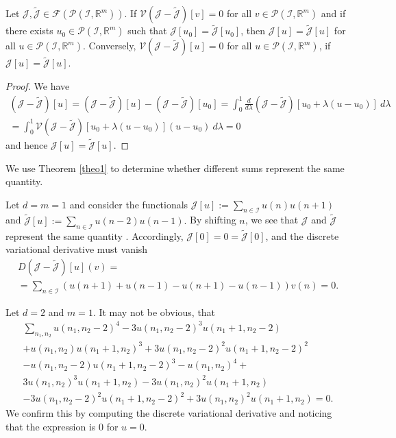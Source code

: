 \documentclass[runningheads]{llncs}
\newcommand{\Rr}{\mathbb{R}}
\newcommand{\1}{\chi}
\newcommand{\Ii}{\mathcal{I}}
\begin{document}
\begin{theorem}\label{theo1}
	Let $\mathcal{J},\tilde{\mathcal{J}}\in \mathcal{F}(\mathcal{P}(\Ii,\Rr^m))$. If $\mathcal{V}(\mathcal{J}-\tilde{\mathcal{J}})[v]=0$ for all $v\in\mathcal{P}(\Ii,\Rr^m)$ and if there exists $u_0\in\mathcal{P}(\Ii,\Rr^m)$ such that $\mathcal{J}[u_0]=\tilde{\mathcal{J}}[u_0]$, then
	$\mathcal{J}[u]=\tilde{\mathcal{J}}[u]$
	for all $u\in\mathcal{P}(\Ii,\Rr^m)$.
	Conversely,
	$\mathcal{V}(\mathcal{J}-\tilde{\mathcal{J}})[u]=0$
	for all $u\in\mathcal{P}(\Ii,\Rr^m)$, if $\mathcal{J}[u]=\tilde{\mathcal{J}}[u]$.
\end{theorem}
\begin{proof}
	We have
	\begin{gather*}
		(\mathcal{J}-\tilde{\mathcal{J}})[u]=(\mathcal{J}-\tilde{\mathcal{J}})[u]-(\mathcal{J}-\tilde{\mathcal{J}})[u_0]=
		\int_{0}^{1}\frac{d}{d\lambda}(\mathcal{J}-\tilde{\mathcal{J}})[u_0+\lambda(u-u_0)]\ d\lambda\\
		=\int_{0}^{1}\mathcal{V}(\mathcal{J}-\tilde{\mathcal{J}})[u_0+\lambda(u-u_0)](u-u_0)\ d\lambda=0
	\end{gather*}
	and hence $\mathcal{J}[u]=\tilde{\mathcal{J}}[u]$.
\end{proof}
We use Theorem \ref{theo1} to determine whether different sums represent the same quantity.
\begin{example}
	Let $d=m=1$ and consider the functionals
$
		\mathcal{J}[u]:=\sum_{n\in\Ii}u(n)u(n+1)$ and $
		\tilde{\mathcal{J}}[u]:=\sum_{n\in\Ii}u(n-2)u(n-1).
$
By shifting $n$, we see that	$\mathcal{J}$ and $\tilde{\mathcal{J}}$ represent the same quantity . Accordingly, $\mathcal{J}[0]=0=\tilde{\mathcal{J}}[0]$, and the discrete variational derivative must vanish
	\begin{gather*}
		D(\mathcal{J}-\tilde{\mathcal{J}})[u](v)=\\
		=\sum_{n\in\Ii}(u(n+1)+u(n-1)-u(n+1)-u(n-1))v(n)=0.
	\end{gather*}
\end{example}

\begin{example}
	Let $d=2$ and $m=1$. It may not be obvious, that
	\begin{gather*}
		\sum_{n_1,n_2}u(n_1,n_2-2)^4 - 3 u(n_1,n_2-2)^3 u(n_1+1,n_2-2) \\+ 
		u(n_1,n_2) u(n_1+1,n_2)^3 + 3 u(n_1,n_2-2)^2 u(n_1+1,n_2-2)^2\\ -
		u(n_1,n_2-2) u(n_1+1,n_2-2)^3
		- u(n_1, n_2)^4 +\\
		3 u(n_1,n_2)^3 u(n_1+1,n_2)- 3 u(n_1,n_2)^2 u(n_1+1,n_2)\\
		-3 u(n_1,n_2-2)^2 u(n_1+1,n_2-2)^2+ 3 u(n_1,n_2)^2 u(n_1+1,n_2)=0.
	\end{gather*}
	We confirm this by computing the discrete variational derivative and noticing that the expression is $0$ for $u=0$.
\end{example}
\end{document}
